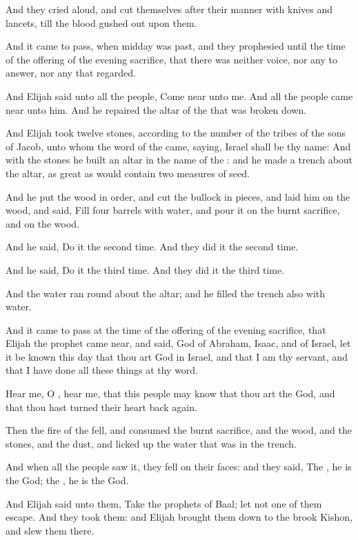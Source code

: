 \verse And they cried aloud, and cut themselves after their manner with knives and lancets, till the blood gushed out upon them.

\verse And it came to pass, when midday was past, and they prophesied until the time of the offering of the evening sacrifice, that there was neither voice, nor any to answer, nor any that regarded.

\verse And Elijah said unto all the people, Come near unto me. And all the people came near unto him. And he repaired the altar of the \LORD that was broken down.

\verse And Elijah took twelve stones, according to the number of the tribes of the sons of Jacob, unto whom the word of the \LORD came, saying, Israel shall be thy name: \verse And with the stones he built an altar in the name of the \LORD: and he made a trench about the altar, as great as would contain two measures of seed.

\verse And he put the wood in order, and cut the bullock in pieces, and laid him on the wood, and said, Fill four barrels with water, and pour it on the burnt sacrifice, and on the wood.

\verse And he said, Do it the second time. And they did it the second time.

And he said, Do it the third time. And they did it the third time.

\verse And the water ran round about the altar; and he filled the trench also with water.

\verse And it came to pass at the time of the offering of the evening sacrifice, that Elijah the prophet came near, and said, \LORD God of Abraham, Isaac, and of Israel, let it be known this day that thou art God in Israel, and that I am thy servant, and that I have done all these things at thy word.

\verse Hear me, O \LORD, hear me, that this people may know that thou art the \LORD God, and that thou hast turned their heart back again.

\verse Then the fire of the \LORD fell, and consumed the burnt sacrifice, and the wood, and the stones, and the dust, and licked up the water that was in the trench.

\verse And when all the people saw it, they fell on their faces: and they said, The \LORD, he is the God; the \LORD, he is the God.

\verse And Elijah said unto them, Take the prophets of Baal; let not one of them escape. And they took them: and Elijah brought them down to the brook Kishon, and slew them there.

